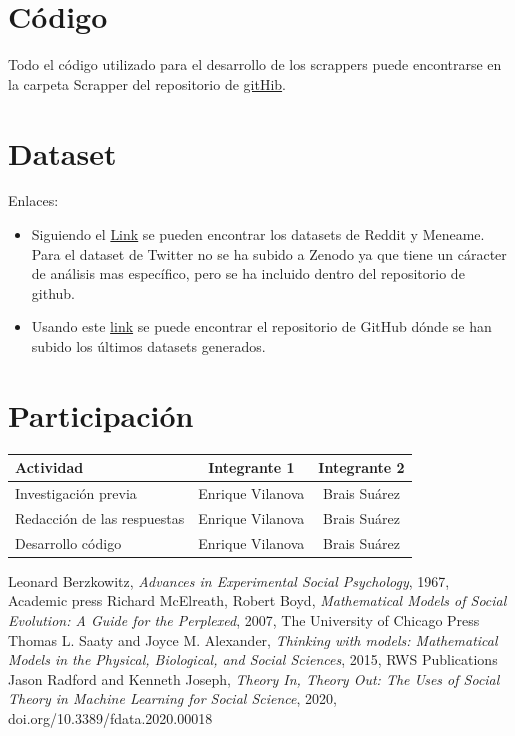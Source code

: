 \documentclass[a4paper,12pt]{article}
\begin{document}
\section{C\'odigo}

Todo el c\'odigo utilizado para el desarrollo de los scrappers puede encontrarse en la carpeta Scrapper del repositorio de \href{https://github.com/Envivi-git/News_analysis.git}{gitHib}.

\section{Dataset}

Enlaces: 

\begin{itemize}

\item Siguiendo el \href{https://zenodo.org/record/4243130}{Link} se  pueden encontrar los datasets de Reddit y Meneame. Para  el dataset de Twitter no se ha subido a Zenodo ya que tiene un c\'aracter de an\'alisis mas espec\'ifico, pero se ha incluido dentro del repositorio de github.

\item Usando este \href{https://github.com/Envivi-git/News_analysis/tree/main/Dataframes_CSV}{link}  se puede encontrar el repositorio de GitHub d\'onde se han subido los \'ultimos datasets generados. 

\end{itemize}

\section{Participaci\'on}

\begin{tabular}{|l|c|c|}\hline

Actividad& Integrante 1& Integrante 2\\\hline
Investigaci\'on previa & Enrique Vilanova & Brais Su\'arez \\\hline
Redacci\'on de las respuestas & Enrique Vilanova & Brais Su\'arez \\\hline
Desarrollo c\'odigo  & Enrique Vilanova & Brais Su\'arez \\\hline

\end{tabular}

\begin{thebibliography}{9}

 Leonard Berzkowitz,%
	\emph{ Advances in Experimental Social Psychology}, 1967,  Academic press
 Richard McElreath, Robert Boyd,%
	\emph{ Mathematical Models of Social Evolution: A Guide for the Perplexed}, 2007, The University of Chicago Press
Thomas L. Saaty and Joyce M. Alexander,%
	\emph{Thinking with models: Mathematical Models in the Physical, Biological, and Social Sciences}, 2015, RWS Publications
Jason Radford and Kenneth Joseph,%
	\emph{Theory In, Theory Out: The Uses of Social Theory in Machine Learning for Social Science}, 2020, doi.org/10.3389/fdata.2020.00018

\end{thebibliography}
\end{document}
